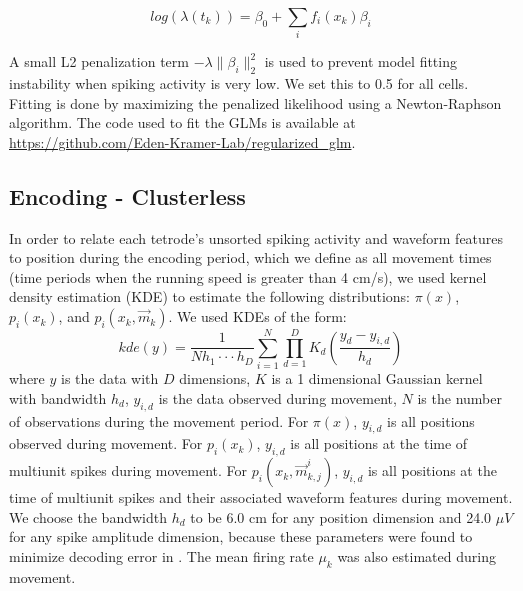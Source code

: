 \documentclass[9pt,lineno]{elife}
\begin{document}
$$log(\lambda(t_k)) = \beta_{0} + \sum_{i} f_{i}(x_k)\beta_{i}$$

A small L2 penalization term $-\lambda\|\beta_{i}\|_{2}^{2}$ is used to prevent model fitting instability when spiking activity is very low. We set this to 0.5 for all cells. Fitting is done by maximizing the penalized likelihood using a Newton-Raphson algorithm. The code used to fit the GLMs is available at \url{https://github.com/Eden-Kramer-Lab/regularized_glm}.

\subsection*{Encoding - Clusterless}
In order to relate each tetrode's unsorted spiking activity and waveform features to position during the encoding period, which we define as all movement times (time periods when the running speed is greater than 4 cm/s), we used kernel density estimation (KDE) to estimate the following distributions: $\pi(x)$, $p_{i}(x_k)$, and $p_{i}(x_k, \vec{m}_k)$. We used KDEs of the form: 
$$
kde(y) = \frac{1}{N h_1\cdot\cdot\cdot h_D} \sum^{N}_{i=1} \prod^{D}_{d=1} K_{d}\left(\frac{y_d - y_{i,d}}{h_d}\right)
$$
where $y$ is the data with $D$ dimensions, $K$ is a 1 dimensional Gaussian kernel with bandwidth $h_d$, $y_{i, d}$ is the data observed during movement, $N$ is the number of observations during the movement period. For $\pi(x)$, $y_{i, d}$ is all positions observed during movement. For $p_{i}(x_k)$, $y_{i, d}$ is all positions at the time of multiunit spikes during movement. For $p_{i}(x_k, \vec{m}^i_{k,j})$, $y_{i, d}$ is all positions at the time of multiunit spikes and their associated waveform features during movement. We choose the bandwidth $h_d$ to be 6.0 cm for any position dimension and 24.0 $\mu V$ for any spike amplitude dimension, because these parameters were found to minimize decoding error in \cite{KloostermanBayesiandecodingusing2014}. The mean firing rate $\mu_k$ was also estimated during movement.
\end{document}
